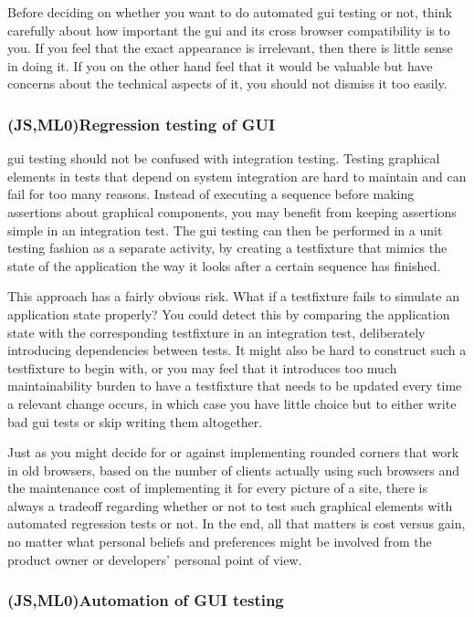 \documentclass[11pt]{article}
\begin{document}
Before deciding on whether you want to do automated \gls{gui} testing or not, think carefully about how important the \gls{gui} and its cross browser compatibility is to you. If you feel that the exact appearance is irrelevant, then there is little sense in doing it. If you on the other hand feel that it would be valuable but have concerns about the technical aspects of it, you should not dismiss it too easily.

\subsubsection{(JS,ML0)Regression testing of GUI}

\gls{gui} testing should not be confused with integration testing. Testing graphical elements in tests that depend on system integration are hard to maintain and can fail for too many reasons. Instead of executing a sequence before making assertions about graphical components, you may benefit from keeping assertions simple in an integration test. The \gls{gui} testing can then be performed in a unit testing fashion as a separate activity, by creating a \gls{testfixture} that mimics the state of the application the way it looks after a certain sequence has finished.

This approach has a fairly obvious risk. What if a \gls{testfixture} fails to simulate an application state properly? You could detect this by comparing the application state with the corresponding \gls{testfixture} in an integration test, deliberately introducing dependencies between tests. It might also be hard to construct such a \gls{testfixture} to begin with, or you may feel that it introduces too much maintainability burden to have a \gls{testfixture} that needs to be updated every time a relevant change occurs, in which case you have little choice but to either write bad \gls{gui} tests or skip writing them altogether.

Just as you might decide for or against implementing rounded corners that work in old browsers, based on the number of clients actually using such browsers and the maintenance cost of implementing it for every picture of a site, there is always a tradeoff regarding whether or not to test such graphical elements with automated regression tests or not. In the end, all that matters is cost versus gain, no matter what personal beliefs and preferences might be involved from the product owner or developers' personal point of view. \cite[questions~40-44]{Ahnve}

\subsubsection{(JS,ML0)Automation of GUI testing}
\end{document}
